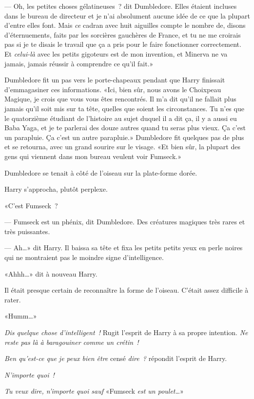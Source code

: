 --- Oh, les petites choses gélatineuses~? dit Dumbledore. Elles étaient incluses dans le bureau de directeur et je n'ai absolument aucune idée de ce que la plupart d'entre elles font. Mais \emph{ce} cadran avec huit aiguilles compte le nombre de, disons d'éternuements, faits par les sorcières gauchères de France, et tu ne me croirais pas si je te disais le travail que ça a pris pour le faire fonctionner correctement. Et \emph{celui-là} avec les petits gigoteurs est de mon invention, et Minerva ne va jamais, jamais réussir à comprendre ce qu'il fait.»

Dumbledore fit un pas vers le porte-chapeaux pendant que Harry finissait d'emmagasiner ces informations. «Ici, bien sûr, nous avons le Choixpeau Magique, je crois que vous vous êtes rencontrés. Il m'a dit qu'il ne fallait plus jamais qu'il soit mis sur ta tête, quelles que soient les circonstances. Tu n'es que le quatorzième étudiant de l'histoire au sujet duquel il a dit ça, il y a aussi eu Baba Yaga, et je te parlerai des douze autres quand tu seras plus vieux. Ça c'est un parapluie. Ça c'est un autre parapluie.» Dumbledore fit quelques pas de plus et se retourna, avec un grand sourire sur le visage. «Et bien sûr, la plupart des gens qui viennent dans mon bureau veulent voir Fumseck.»

Dumbledore se tenait à côté de l'oiseau sur la plate-forme dorée.

Harry s'approcha, plutôt perplexe.

«C'est Fumseck~?

--- Fumseck est un phénix, dit Dumbledore. Des créatures magiques très rares et très puissantes.

--- Ah…» dit Harry. Il baissa sa tête et fixa les petits petits yeux en perle noires qui ne montraient pas le moindre signe d'intelligence.

«Ahhh…» dit à nouveau Harry.

Il était presque certain de reconnaître la forme de l'oiseau. C'était assez difficile à rater.

«Humm…»

\emph{Dis quelque chose d'intelligent~!} Rugit l'esprit de Harry à sa propre intention. \emph{Ne reste pas là à baragouiner comme un crétin~!}

\emph{Ben qu'est-ce que je peux bien être} censé \emph{dire~?} répondit l'esprit de Harry.

\emph{N'importe quoi~!}

\emph{Tu veux dire, n'importe quoi sauf} «Fumseck \emph{est un poulet…}»

